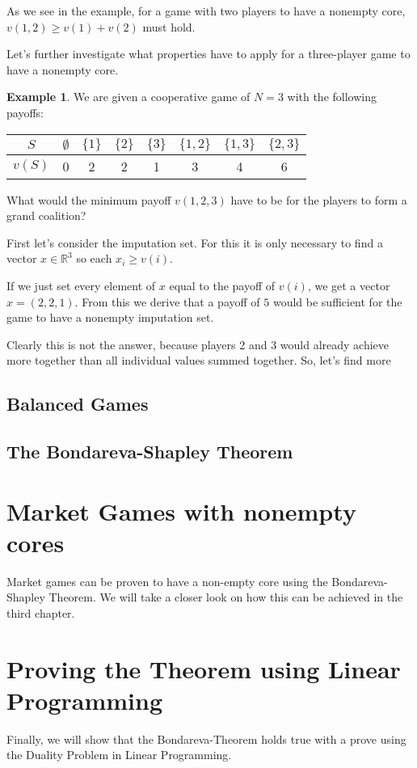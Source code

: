 \documentclass[10pt,a4paper,titlepage]{article}
\theoremstyle{plain}
\theoremstyle{definition}
\newtheorem{example}[thm]{Example} %
\begin{document}
  As we see in the example, for a game with two players to have a nonempty core, $v(1, 2) \geq v(1) + v(2)$ must hold.

  Let's further investigate what properties have to apply for a three-player game to have a nonempty core.

  \begin{example}
      We are given a cooperative game of $N = 3$ with the following payoffs:

      \begin{tabular}{c | c c c c c c c}
          $S$ & $\emptyset$ & $\{1\}$ & $\{2\}$ & $\{3\}$ & $\{1, 2\}$ & $\{1, 3\}$ & $\{2, 3\}$\\
          \hline
          $v(S)$ & 0 & 2 & 2 & 1 & 3 & 4 & 6
      \end{tabular}

      What would the minimum payoff $v(1, 2, 3)$ have to be for the players to form a grand coalition?

      First let's consider the imputation set. For this it is only necessary to find a vector $x \in \mathbb{R}^3$ so each $x_i \geq v(i)$.
    
      If we just set every element of $x$ equal to the payoff of $v(i)$, we get a vector $x = (2, 2, 1)$. From this we derive that a payoff of $5$ would be sufficient for the game to have a nonempty imputation set.

      Clearly this is not the answer, because players 2 and 3 would already achieve more together than all individual values summed together. So, let's find more 
  \end{example}

 \subsection{Balanced Games}

 \subsection{The Bondareva-Shapley Theorem}

 \section{Market Games with nonempty cores}
 Market games can be proven to have a non-empty core using the Bondareva-Shapley Theorem. We will take a closer look on how this can be achieved in the third chapter.

 \section{Proving the Theorem using Linear Programming}
 Finally, we will show that the Bondareva-Theorem holds true with a prove using the Duality Problem in Linear Programming.
 
\pagebreak
 


\end{document}
